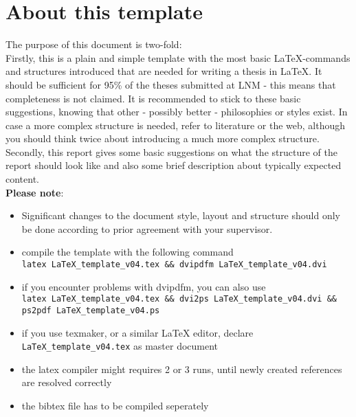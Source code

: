 \section{About this template}
\label{sec:about}

The purpose of this document is two-fold:\\
Firstly, this is a plain and simple template with the most basic \LaTeX-commands and
structures introduced that are
needed for writing a thesis in \LaTeX. It should be sufficient for 95\% of
the theses submitted at \ac{LNM} - this means that completeness is not claimed. It is recommended to
stick to these basic suggestions, knowing that other - possibly better -
philosophies or styles exist. In case a more complex structure is needed, refer to literature or the web, although you should think
twice about introducing a much more complex structure. \\
Secondly, this report gives some basic suggestions on what the structure of the report should look like and also some brief description about typically expected content.\\

\textbf{Please note}: 
\begin{itemize}
 \item Significant changes to the document style, layout and structure should only be done according to prior agreement with your supervisor.
 \item compile the template with the following command \\
 \verb|latex LaTeX_template_v04.tex && dvipdfm LaTeX_template_v04.dvi|
 \item if you encounter problems with dvipdfm, you can also use \\
 \verb|latex LaTeX_template_v04.tex && dvi2ps LaTeX_template_v04.dvi &&|\\
 \verb|ps2pdf LaTeX_template_v04.ps| \\
 \item if you use texmaker, or a similar LaTeX editor, declare \verb|LaTeX_template_v04.tex| as master document   \\
 \item the latex compiler might requires 2 or 3 runs, until newly created references are resolved correctly \\
 \item the bibtex file has to be compiled seperately
\end{itemize}